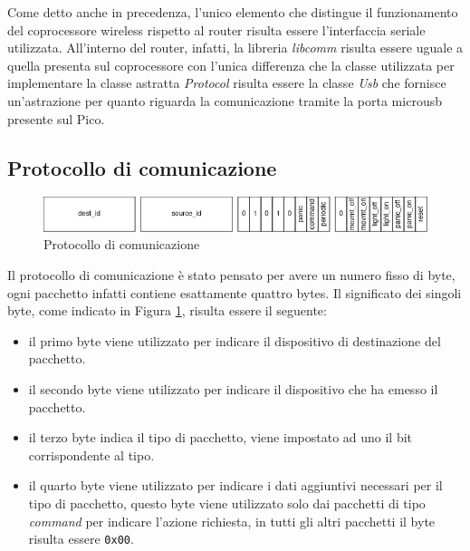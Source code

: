 \documentclass{article}
\begin{document}
	Come detto anche in precedenza, l'unico elemento che distingue il funzionamento del coprocessore wireless rispetto al router risulta essere l'interfaccia seriale utilizzata. All'interno del router, infatti, la libreria \textit{libcomm} risulta essere uguale a quella presenta sul coprocessore con l'unica differenza che la classe utilizzata per implementare la classe astratta \textit{Protocol} risulta essere la classe \textit{Usb} che fornisce un'astrazione per quanto riguarda la comunicazione tramite la porta microusb presente sul Pico.
	
	\subsection{Protocollo di comunicazione}
	\begin{figure}[ht]
		\centering
		\includegraphics[scale=0.5]{./images/Protocol.jpg}
		\caption{Protocollo di comunicazione}
		\label{img:protocol}
	\end{figure}
	Il protocollo di comunicazione \`e stato pensato per avere un numero fisso di byte, ogni pacchetto infatti contiene esattamente quattro bytes.
	Il significato dei singoli byte, come indicato in Figura \ref{img:protocol}, risulta essere il seguente:
	\begin{itemize}
		\item il primo byte viene utilizzato per indicare il dispositivo di destinazione del pacchetto.
		\item il secondo byte viene utilizzato per indicare il dispositivo che ha emesso il pacchetto.
		\item il terzo byte indica il tipo di pacchetto, viene impostato ad uno il bit corrispondente al tipo.
		\item il quarto byte viene utilizzato per indicare i dati aggiuntivi necessari per il tipo di pacchetto, questo byte viene utilizzato solo dai pacchetti di tipo \textit{command} per indicare l'azione richiesta, in tutti gli altri pacchetti il byte risulta essere \texttt{0x00}.
	\end{itemize}
	
\end{document}
